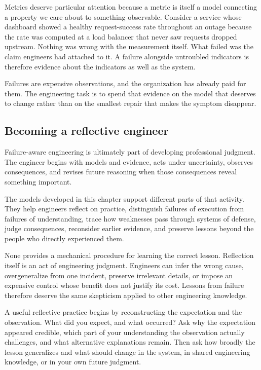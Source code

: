 Metrics deserve particular attention because a metric is itself a model connecting a property we
care about to something observable. Consider a service whose dashboard showed a healthy
request-success rate throughout an outage because the rate was computed at a load balancer that
never saw requests dropped upstream. Nothing was wrong with the measurement itself. What failed was
the claim engineers had attached to it. A failure alongside untroubled indicators is therefore
evidence about the indicators as well as the system.

Failures are expensive observations, and the organization has already paid for them. The
engineering task is to spend that evidence on the model that deserves to change rather than on the
smallest repair that makes the symptom disappear.

\subsection{Becoming a reflective engineer}\label{sec-reflective-engineer}

Failure-aware engineering is ultimately part of developing professional judgment. The engineer
begins with models and evidence, acts under uncertainty, observes consequences, and revises future
reasoning when those consequences reveal something important.

The models developed in this chapter support different parts of that activity. They help engineers
reflect on practice, distinguish failures of execution from failures of understanding, trace how
weaknesses pass through systems of defense, judge consequences, reconsider earlier evidence, and
preserve lessons beyond the people who directly experienced them.

None provides a mechanical procedure for learning the correct lesson. Reflection itself is an act
of engineering judgment. Engineers can infer the wrong cause, overgeneralize from one incident,
preserve irrelevant details, or impose an expensive control whose benefit does not justify its
cost. Lessons from failure therefore deserve the same skepticism applied to other engineering
knowledge.

A useful reflective practice begins by reconstructing the expectation and the observation. What
did you expect, and what occurred? Ask why the expectation appeared credible, which part of your
understanding the observation actually challenges, and what alternative explanations remain. Then
ask how broadly the lesson generalizes and what should change in the system, in shared engineering
knowledge, or in your own future judgment.

